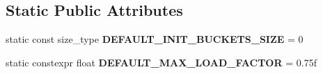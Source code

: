 \subsection*{Static Public Attributes}
\begin{DoxyCompactItemize}
\item 
\mbox{\label{classtsl_1_1detail__ordered__hash_1_1ordered__hash_abef368126aac0177fcf90d85c63eedef}} 
static const size\+\_\+type {\bfseries D\+E\+F\+A\+U\+L\+T\+\_\+\+I\+N\+I\+T\+\_\+\+B\+U\+C\+K\+E\+T\+S\+\_\+\+S\+I\+ZE} = 0
\item 
\mbox{\label{classtsl_1_1detail__ordered__hash_1_1ordered__hash_adb967b1e90588c1c9af9ecda50e80887}} 
static constexpr float {\bfseries D\+E\+F\+A\+U\+L\+T\+\_\+\+M\+A\+X\+\_\+\+L\+O\+A\+D\+\_\+\+F\+A\+C\+T\+OR} = 0.\+75f
\end{DoxyCompactItemize}
